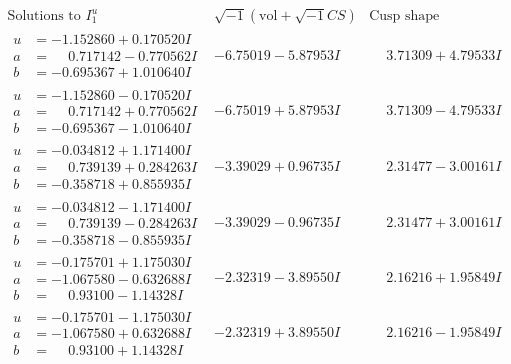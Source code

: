 \documentclass[1p]{elsarticle_modified}
\theoremstyle{definition}
\newcommand{\I}{\sqrt{-1}}
\begin{document}
$$\begin{array}{c|c|c}  
\text{Solutions to }I^u_{1}& \I (\text{vol} + \sqrt{-1}CS) & \text{Cusp shape}\\
 \hline 
\begin{aligned}
u &= -1.152860 + 0.170520 I \\
a &= \phantom{-}0.717142 - 0.770562 I \\
b &= -0.695367 + 1.010640 I\end{aligned}
 & -6.75019 - 5.87953 I & \phantom{-}3.71309 + 4.79533 I \\ \hline\begin{aligned}
u &= -1.152860 - 0.170520 I \\
a &= \phantom{-}0.717142 + 0.770562 I \\
b &= -0.695367 - 1.010640 I\end{aligned}
 & -6.75019 + 5.87953 I & \phantom{-}3.71309 - 4.79533 I \\ \hline\begin{aligned}
u &= -0.034812 + 1.171400 I \\
a &= \phantom{-}0.739139 + 0.284263 I \\
b &= -0.358718 + 0.855935 I\end{aligned}
 & -3.39029 + 0.96735 I & \phantom{-}2.31477 - 3.00161 I \\ \hline\begin{aligned}
u &= -0.034812 - 1.171400 I \\
a &= \phantom{-}0.739139 - 0.284263 I \\
b &= -0.358718 - 0.855935 I\end{aligned}
 & -3.39029 - 0.96735 I & \phantom{-}2.31477 + 3.00161 I \\ \hline\begin{aligned}
u &= -0.175701 + 1.175030 I \\
a &= -1.067580 - 0.632688 I \\
b &= \phantom{-}0.93100 - 1.14328 I\end{aligned}
 & -2.32319 - 3.89550 I & \phantom{-}2.16216 + 1.95849 I \\ \hline\begin{aligned}
u &= -0.175701 - 1.175030 I \\
a &= -1.067580 + 0.632688 I \\
b &= \phantom{-}0.93100 + 1.14328 I\end{aligned}
 & -2.32319 + 3.89550 I & \phantom{-}2.16216 - 1.95849 I \\ \hline\begin{aligned}

\end{aligned}
\end{array}$$
\end{document}
